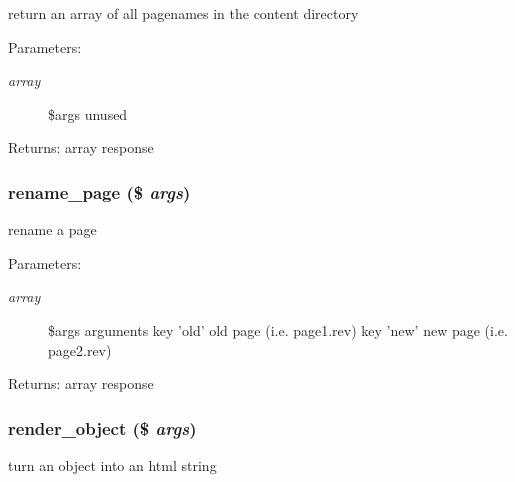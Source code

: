 return an array of all pagenames in the content directory

\begin{Desc}
\item[Parameters:]
\begin{description}
\item[{\em array}]\$args unused \end{description}
\end{Desc}
\begin{Desc}
\item[Returns:]array response \end{Desc}
\hypertarget{module__glue_8inc_8php_cd08b36587528b6f088cafb7d1d6bd29}{
\subsubsection[{rename\_\-page}]{\setlength{\rightskip}{0pt plus 5cm}rename\_\-page (\$ {\em args})}}
\label{module__glue_8inc_8php_cd08b36587528b6f088cafb7d1d6bd29}


rename a page \begin{Desc}
\item[Parameters:]
\begin{description}
\item[{\em array}]\$args arguments key 'old' old page (i.e. page1.rev) key 'new' new page (i.e. page2.rev) \end{description}
\end{Desc}
\begin{Desc}
\item[Returns:]array response \end{Desc}
\hypertarget{module__glue_8inc_8php_e9103a74e4b40e88536fbc0a52d1c72f}{
\subsubsection[{render\_\-object}]{\setlength{\rightskip}{0pt plus 5cm}render\_\-object (\$ {\em args})}}
\label{module__glue_8inc_8php_e9103a74e4b40e88536fbc0a52d1c72f}


turn an object into an html string

